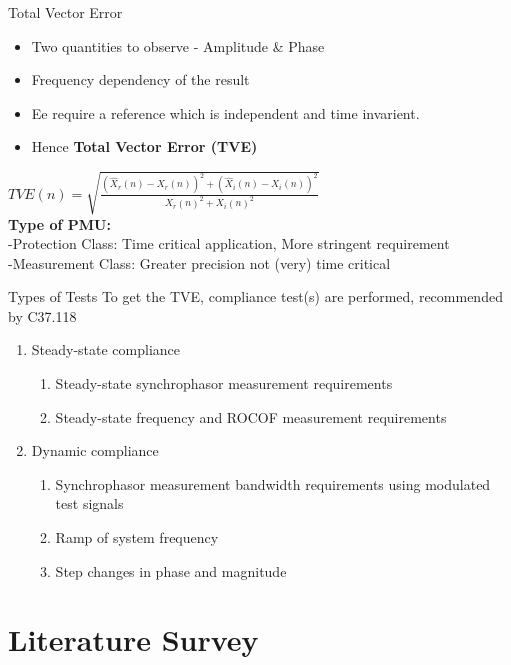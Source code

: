 \documentclass{beamer}
\begin{document}
   
   \begin{frame}{Total Vector Error}

	\begin{itemize}
	\item Two quantities to observe - Amplitude \& Phase
	\item Frequency dependency of the result
	\item Ee require a reference which is  independent and time invarient.
	\item Hence \textbf{Total Vector Error (TVE)} %
	\end{itemize}
	$ TVE(n) = \sqrt{\frac{ (\hat{X}_r(n) - X_r(n))^2 + (\hat{X}_i(n)-X_i(n))^2} {X_r(n)^2 + X_i(n)^2}} $ \\
\vspace{5pt}
 \textbf{Type of PMU:}\\
 -Protection  Class: Time critical application, More stringent requirement \\ 
 -Measurement Class: Greater precision not (very) time critical 
   \end{frame}
\begin{frame}{Types of Tests}
To get the TVE, compliance test(s) are performed, recommended by C37.118
\begin{enumerate}
\item Steady-state compliance
	\begin{enumerate}
	\item Steady-state synchrophasor measurement requirements
	\item Steady-state frequency and ROCOF measurement requirements
	\end{enumerate}
\item Dynamic compliance
	\begin{enumerate}
	\item Synchrophasor measurement bandwidth requirements using modulated test signals
	\item Ramp of system frequency
	\item Step changes in phase and magnitude 
	\end{enumerate}
\end{enumerate} 

\end{frame}

\section{Literature Survey}
\end{document}
